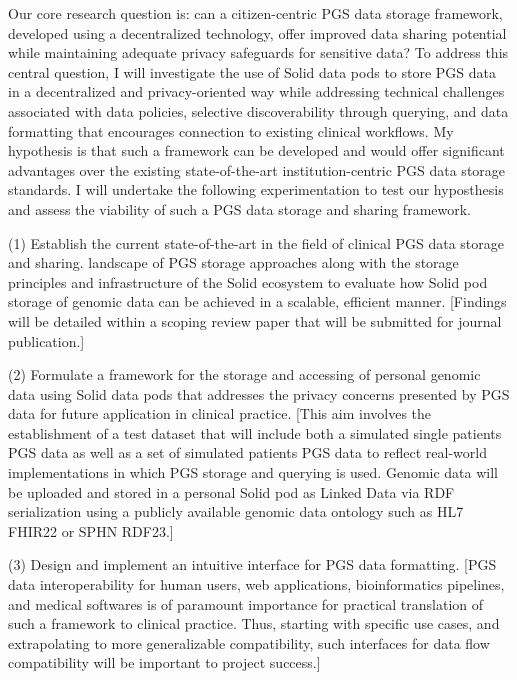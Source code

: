 \documentclass{article}
\begin{document}
Our core research question is: can a citizen-centric PGS data storage framework, developed using a decentralized technology, offer improved data sharing potential while maintaining adequate privacy safeguards for sensitive data? To address this central question, I will investigate the use of Solid data pods to store PGS data in a decentralized and privacy-oriented way while addressing technical challenges associated with data policies, selective discoverability through querying, and data formatting that encourages connection to existing clinical workflows. My hypothesis is that such a framework can be developed and would offer significant advantages over the existing state-of-the-art institution-centric PGS data storage standards. I will undertake the following experimentation to test our hyposthesis and assess the viability of such a PGS data storage and sharing framework.

(1) Establish the current state-of-the-art in the field of clinical PGS data storage and sharing.  landscape of PGS storage approaches along with the storage principles and infrastructure of the Solid ecosystem to evaluate how Solid pod storage of genomic data can be achieved in a scalable, efficient manner. [Findings will be detailed within a scoping review paper that will be submitted for journal publication.]

(2) Formulate a framework for the storage and accessing of personal genomic data using Solid data pods that addresses the privacy concerns presented by PGS data for future application in clinical practice. [This aim involves the establishment of a test dataset that will include both a simulated single patient\textquotesingle s PGS data as well as a set of simulated patient\textquotesingle s PGS data to reflect real-world implementations in which PGS storage and querying is used. Genomic data will be uploaded and stored in a personal Solid pod as Linked Data via RDF serialization using a publicly available genomic data ontology such as HL7 FHIR22 or SPHN RDF23.]

(3) Design and implement an intuitive interface for PGS data formatting. [PGS data interoperability for human users, web applications, bioinformatics pipelines, and medical softwares is of paramount importance for practical translation of such a framework to clinical practice. Thus, starting with specific use cases, and extrapolating to more generalizable compatibility, such interfaces for data flow compatibility will be important to project success.]
\end{document}
